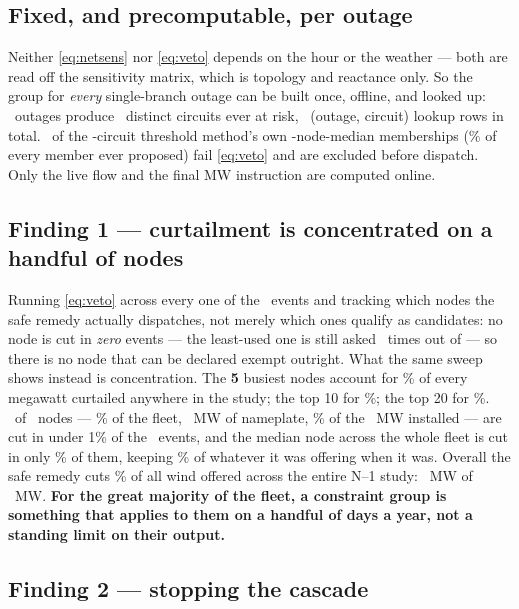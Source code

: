 \subsection*{Fixed, and precomputable, per outage}

Neither \eqref{eq:netsens} nor \eqref{eq:veto} depends on the hour or the
weather --- both are read off the sensitivity matrix, which is topology and
reactance only. So the group for \emph{every} single-branch outage can be
built once, offline, and looked up: \pTripsOutages\ outages produce
\pTripsCircuits\ distinct circuits ever at risk, \pTrips\ (outage, circuit)
lookup rows in total. \pVetoedFromEir\ of the \pTripsCircuits-circuit
threshold method's own \pEirMedNodes-node-median memberships
(\pVetoedFromEirPct\% of every member ever proposed) fail \eqref{eq:veto} and
are excluded before dispatch. Only the live flow and the final MW instruction
are computed online.

\subsection*{Finding 1 --- curtailment is concentrated on a handful of nodes}

Running \eqref{eq:veto} across every one of the \pN\ events and tracking which
nodes the safe remedy actually dispatches, not merely which ones qualify as
candidates: no node is cut in \emph{zero} events --- the least-used one is
still asked \pMinCutEvents\ times out of \pN --- so there is no node that can
be declared exempt outright. What the same sweep shows instead is
concentration. The \textbf{5} busiest nodes account for \pTopFivePct\% of every
megawatt curtailed anywhere in the study; the top 10 for \pTopTenPct\%; the top
20 for \pTopTwentyPct\%. \pRareN\ of \pWindN\ nodes --- \pRarePct\% of the fleet,
\pRareMW\ MW of nameplate, \pRareFleetPct\% of the \pWindFleetMW\ MW installed
--- are cut in under 1\% of the \pN\ events, and the median node across the
whole fleet is cut in only \pMedEventsPct\% of them, keeping \pMedKeptPct\% of
whatever it was offering when it was. Overall the safe remedy cuts
\pOverallCutPct\% of all wind offered across the entire N--1 study:
\pTotalCutMW\ MW of \pTotalOfferedMW\ MW. \textbf{For the great majority of
the fleet, a constraint group is something that applies to them on a handful
of days a year, not a standing limit on their output.}

\subsection*{Finding 2 --- stopping the cascade}

